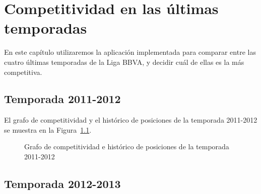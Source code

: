 \chapter{Competitividad en las últimas temporadas}

En este capítulo utilizaremos la aplicación implementada para comparar entre las cuatro últimas temporadas de la Liga BBVA, y decidir cuál de ellas es la más competitiva.\\

\section{Temporada 2011-2012}

El grafo de competitividad y el histórico de posiciones de la temporada 2011-2012 se muestra en la Figura~\ref{fig:grafo-2011-2012}.


\begin{figure}[htbp]
\centering
{}
\caption[Competitividad de la temporada 2011-2012]{Grafo de competitividad e histórico de posiciones de la temporada 2011-2012} \label{fig:grafo-2011-2012}
\end{figure}

\clearpage

\section{Temporada 2012-2013}

